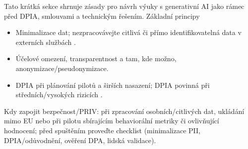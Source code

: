 Tato krátká sekce shrnuje zásady pro návrh výuky s generativní AI jako rámec před DPIA, smlouvami a technickým řešením.
Základní principy
\begin{itemize}
  \item Minimalizace dat; nezpracovávejte citlivá či přímo identifikovatelná data v externích službách \cite{kb_ai_101_tipu_pdf_04e4a115_page_8_1}.
  \item Účelové omezení, transparentnost a tam, kde možno, anonymizace/pseudonymizace.
  \item DPIA při plánování pilotů a širších nasazení; DPIA povinná při středních/vysokých rizicích \cite{kb_malinka_chatgpt_ve_vyuce_dva_roky_pote_2024_pdf_90bc3aaf_page_12_1}.
\end{itemize}
Kdy zapojit bezpečnost/PRIV: při zpracování osobních/citlivých dat, ukládání mimo EU nebo při pilotu sbírajícím behaviorální metriky či ovlivňující hodnocení; před spuštěním proveďte checklist (minimalizace PII, DPIA/odůvodnění, ověření DPA, lidská validace).
